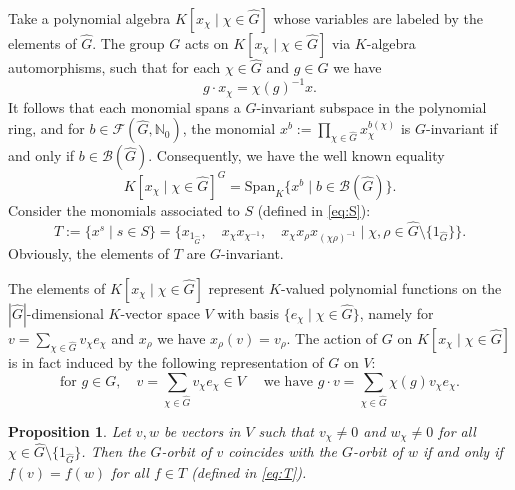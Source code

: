 \documentclass[12pt, oneside]{amsart}
\newtheorem{proposition}[theorem]{\bf Proposition}
\def\field{K}
\def\NN{\mathbb{N}}
\begin{document}
Take a polynomial algebra $\field[x_\chi\mid \chi\in \widehat G]$ 
whose variables are labeled by the elements of $\widehat G$. 
The group $G$ acts on  $\field[x_\chi\mid \chi\in \widehat G]$ via $\field$-algebra automorphisms, such that for each $\chi\in \widehat G$ and $g\in G$ we have 
\begin{equation*}\label{eq:action on x_chi} 
g\cdot x_\chi=\chi(g)^{-1}x.\end{equation*} 
It follows that  each monomial spans a $G$-invariant subspace in the polynomial ring, 
and for $b\in \mathcal{F}(\widehat G,\NN_0)$, the monomial  
$x^b:=\prod_{\chi\in\widehat G}x_\chi^{b(\chi)}$ is $G$-invariant if and only if $b\in \mathcal{B}(\widehat G)$. 
Consequently, we have the well known equality 
\begin{equation}\label{eq:B(G) span} 
\field[x_\chi\mid \chi\in\widehat G]^G=\mathrm{Span}_\field\{x^b\mid b\in \mathcal{B}(\widehat G)\}.
\end{equation} 
Consider the monomials associated to  $S$ (defined in \eqref{eq:S}): 
\begin{equation}\label{eq:T} T:=\{x^s\mid s\in S\}= \{x_{1_{\widehat G}},\quad x_\chi x_{\chi^{-1}}, \quad 
x_\chi x_\rho x_{(\chi\rho)^{-1}}\mid \chi, \rho\in \widehat G\setminus \{1_{\widehat G}\}\}.
\end{equation}  
Obviously, the elements of $T$ are $G$-invariant. 

The elements of $\field[x_\chi\mid \chi\in \widehat G]$ represent $\field$-valued polynomial functions on the $|\widehat G|$-dimensional $\field$-vector space 
$V$ 
with basis $\{e_\chi\mid \chi\in \widehat G\}$, namely for 
$v=\sum_{\chi\in \widehat G}v_\chi e_\chi$ and $x_\rho$ we have  
$x_\rho(v)=v_\rho$. 
The action of $G$ on  $\field[x_\chi\mid \chi\in \widehat G]$ is in fact induced by the following 
representation of $G$ on $V$: 
\[\text{for }g\in G,\quad v=\sum_{\chi\in \widehat G}v_\chi e_\chi\in V
\quad\text{ we have }
g\cdot v=\sum_{\chi\in\widehat G}\chi(g)v_\chi e_\chi.\]  

\begin{proposition} \label{prop:deg 3 separating on torus} 
Let $v,w$ be vectors in $V$ such that 
$v_\chi\neq 0$ and $w_\chi\neq 0$ for all $\chi\in\widehat G\setminus \{1_{\widehat G}\}$. 
Then the $G$-orbit of $v$ coincides with the $G$-orbit of $w$ if and only if 
$f(v)=f(w)$ for all $f\in T$ (defined in \eqref{eq:T}). 
\end{proposition}
\end{document}
